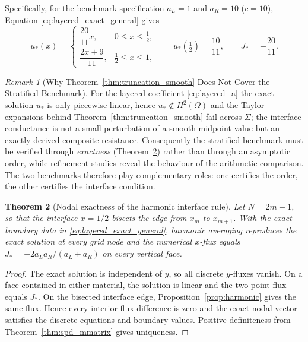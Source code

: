 \documentclass[11pt,a4paper]{article}
\newtheorem{theorem}{Theorem}[section]
\theoremstyle{definition}
\theoremstyle{remark}
\newtheorem{remark}[theorem]{Remark}
\begin{document}
Specifically, for the benchmark specification $a_L = 1$ and $a_R = 10$ ($c = 10$), Equation \eqref{eq:layered_exact_general} gives
\begin{equation}
    u_*(x) = \begin{cases}
        \dfrac{20}{11}x, & 0 \le x \le \tfrac{1}{2}, \\[3mm]
        \dfrac{2x + 9}{11}, & \tfrac{1}{2} \le x \le 1,
    \end{cases}
    \qquad
    u_*\!\left(\tfrac{1}{2}\right) = \frac{10}{11}, \qquad J_* = -\frac{20}{11}.
    \label{eq:layered_exact_c10}
\end{equation}

\begin{remark}[Why Theorem~\ref{thm:truncation_smooth} Does Not Cover the Stratified Benchmark]
\label{rem:thm2_scope}
For the layered coefficient \eqref{eq:layered_a} the exact solution $u_*$ is only piecewise linear, hence $u_*\notin H^2(\Omega)$ and the Taylor expansions behind Theorem~\ref{thm:truncation_smooth} fail across $\Sigma$; the interface conductance is not a small perturbation of a smooth midpoint value but an exactly derived composite resistance. Consequently the stratified benchmark must be verified through \emph{exactness} (Theorem~\ref{thm:nodal_exactness}) rather than through an asymptotic order, while refinement studies reveal the behaviour of the arithmetic comparison. The two benchmarks therefore play complementary roles: one certifies the order, the other certifies the interface condition.
\end{remark}

\begin{theorem}[Nodal exactness of the harmonic interface rule]
\label{thm:nodal_exactness}
Let $N=2m+1$, so that the interface $x=1/2$ bisects the edge from
$x_m$ to $x_{m+1}$. With the exact boundary data in
\eqref{eq:layered_exact_general}, harmonic averaging reproduces the exact
solution at every grid node and the numerical $x$-flux equals
$J_*=-2a_La_R/(a_L+a_R)$ on every vertical face.
\end{theorem}
\begin{proof}
The exact solution is independent of $y$, so all discrete $y$-fluxes vanish.
On a face contained in either material, the solution is linear and the
two-point flux equals $J_*$. On the bisected interface edge,
Proposition~\ref{prop:harmonic} gives the same flux. Hence every interior
flux difference is zero and the exact nodal vector satisfies the discrete
equations and boundary values. Positive definiteness from
Theorem~\ref{thm:spd_mmatrix} gives uniqueness.
\end{proof}
\end{document}
